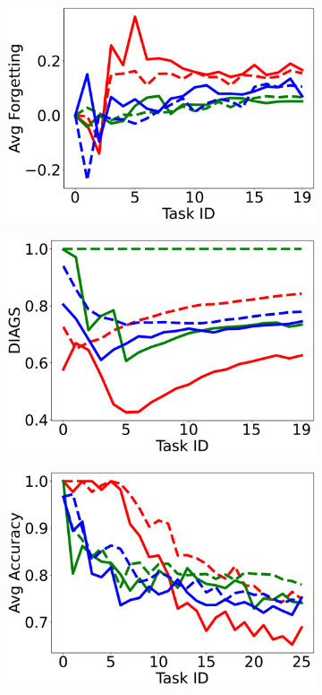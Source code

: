 \begin{figure}
\begin{subfigure}{.24\textwidth}
\end{subfigure}    
\begin{subfigure}{.24\textwidth}
\includegraphics[width=\textwidth]{imgs/cem/KANDY_1_avg_forgetting-test.pdf}
\caption{}
\end{subfigure}
\begin{subfigure}{.24\textwidth}
\includegraphics[width=\textwidth]{imgs/cem/KANDY_1_diagonalized_extended-test.pdf}   
\caption{}
\end{subfigure}
\begin{subfigure}{.24\textwidth}
\includegraphics[width=\textwidth]{imgs/cem/KANDY_2_avg_accuracy-test.pdf}    

\end{subfigure}
\end{figure}

